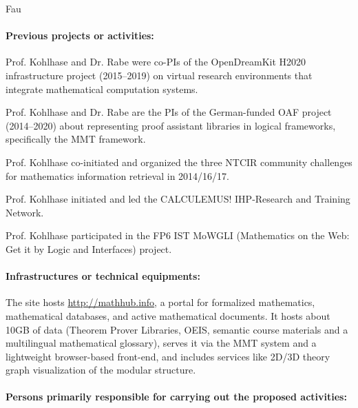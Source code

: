 \begin{sitedescription}{Fau}
\paragraph*{Previous projects or activities:}


\begin{compactitem}
 \item Prof. Kohlhase and Dr. Rabe were co-PIs of the OpenDreamKit H2020 infrastructure project (2015--2019) on virtual research environments that integrate mathematical computation systems.
 \item Prof. Kohlhase and Dr. Rabe are the PIs of the German-funded OAF project (2014--2020) about representing proof assistant libraries in logical frameworks, specifically the MMT framework.
 \item Prof. Kohlhase co-initiated and organized the three NTCIR community challenges for mathematics information retrieval in 2014/16/17.
 \item Prof. Kohlhase initiated and led the CALCULEMUS! IHP-Research and Training Network.
 \item Prof. Kohlhase participated in the FP6 IST MoWGLI (Mathematics on the Web: Get it by Logic and Interfaces) project.
\end{compactitem}

\paragraph*{Infrastructures or technical equipments:}

The site hosts \url{http://mathhub.info}, a portal for formalized mathematics, mathematical databases, and active mathematical documents.
It hosts about 10GB of data (Theorem Prover Libraries, OEIS, semantic course materials and a multilingual mathematical glossary), serves it via the MMT system and a lightweight browser-based front-end, and includes services like 2D/3D theory graph visualization of the modular structure.

\paragraph*{Persons primarily responsible for carrying out the proposed activities:}


\end{sitedescription}
